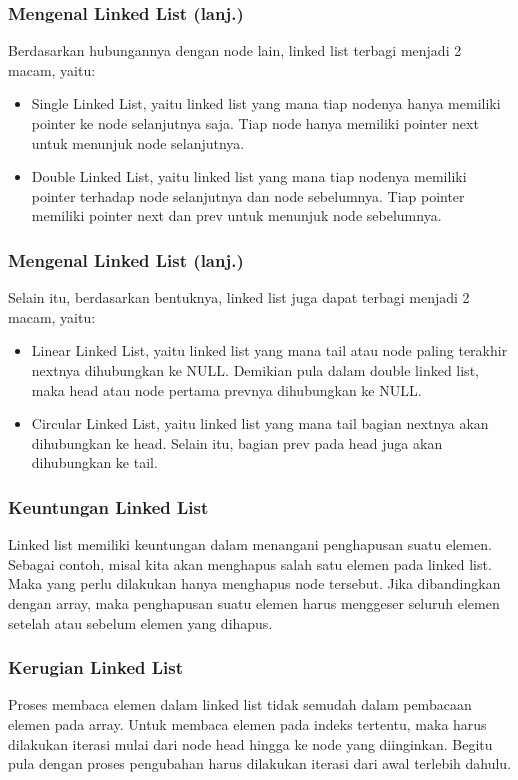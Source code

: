 \begin{frame}
\frametitle{Mengenal Linked List (lanj.)}
Berdasarkan hubungannya dengan node lain, linked list terbagi menjadi 2 macam, yaitu:
\begin{itemize}
  \item Single Linked List, yaitu linked list yang mana tiap nodenya hanya memiliki pointer ke node selanjutnya saja. Tiap node hanya memiliki pointer \alert{next} untuk menunjuk node selanjutnya.
  \item Double Linked List, yaitu linked list yang mana tiap nodenya memiliki pointer terhadap node selanjutnya dan node sebelumnya. Tiap pointer memiliki pointer next dan \alert{prev} untuk menunjuk node sebelumnya.
\end{itemize}
\end{frame}

\begin{frame}
\frametitle{Mengenal Linked List (lanj.)}
Selain itu, berdasarkan bentuknya, linked list juga dapat terbagi menjadi 2 macam, yaitu:
\begin{itemize}
  \item Linear Linked List, yaitu linked list yang mana \alert{tail} atau node paling terakhir nextnya dihubungkan ke \alert{NULL}. Demikian pula dalam double linked list, maka \alert{head} atau node pertama prevnya dihubungkan ke NULL.
  \item Circular Linked List, yaitu linked list yang mana tail bagian nextnya akan dihubungkan ke head. Selain itu, bagian prev pada head juga akan dihubungkan ke tail. 
\end{itemize}
\end{frame}

\begin{frame}
\frametitle{Keuntungan Linked List}
Linked list memiliki keuntungan dalam menangani penghapusan suatu elemen. Sebagai contoh, misal kita akan menghapus salah satu elemen pada linked list. Maka yang perlu dilakukan hanya menghapus node tersebut. Jika dibandingkan dengan array, maka penghapusan suatu elemen harus menggeser seluruh elemen setelah atau sebelum elemen yang dihapus.
\end{frame}

\begin{frame}
\frametitle{Kerugian Linked List}
Proses membaca elemen dalam linked list tidak semudah dalam pembacaan elemen pada array. Untuk membaca elemen pada indeks tertentu, maka harus dilakukan iterasi mulai dari node head hingga ke node yang diinginkan. Begitu pula dengan proses pengubahan harus dilakukan iterasi dari awal terlebih dahulu.
\end{frame}

